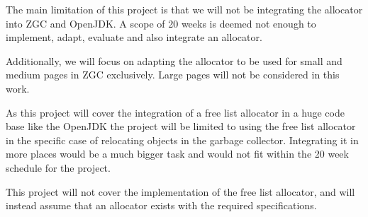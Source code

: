 
The main limitation of this project is that we will not be integrating the allocator into ZGC and OpenJDK. A scope of 20 weeks is deemed not enough to implement, adapt, evaluate and also integrate an allocator.

Additionally, we will focus on adapting the allocator to be used for small and medium pages in ZGC exclusively. Large pages will not be considered in this work.



As this project will cover the integration of a free list allocator in a huge code base like the OpenJDK the project will be limited to using the free list allocator in the specific case of relocating objects in the garbage collector. Integrating it in more places would be a much bigger task and would not fit within the 20 week schedule for the project.

This project will not cover the implementation of the free list allocator, and will instead assume that an allocator exists with the required specifications. 
